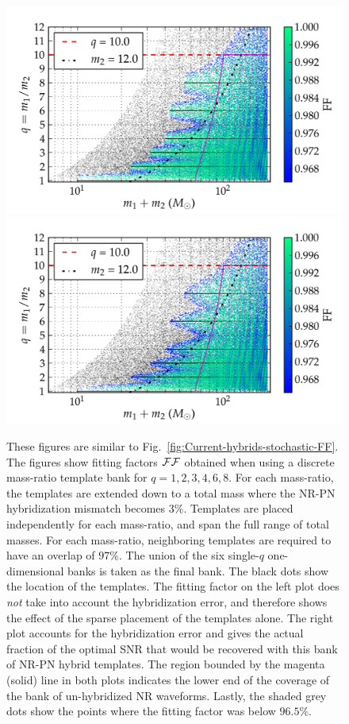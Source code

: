 \begin{figure}
\begin{center}
\includegraphics[width=\columnwidth]{figures/nrhybbank/bank_26022013_02_mtot200_logMq_NOhybMM-tiny.png}
\includegraphics[width=\columnwidth]{figures/nrhybbank/bank_26022013_02_mtot200_logMq_hybMM-tiny.png}
\caption{\label{fig:Current-hybrids-FF}These figures are similar to 
  Fig.~\ref{fig:Current-hybrids-stochastic-FF}. The figures show fitting
  factors $\mathcal{FF}$ obtained when using a discrete mass-ratio template bank for
  $q=1,2,3,4,6,8$. For each mass-ratio, the templates are extended down 
  to a total mass where the NR-PN hybridization mismatch becomes
  $3\%$. Templates are placed independently for each mass-ratio, and span the 
  full range of total masses. For each mass-ratio, neighboring templates are 
  required to have an overlap of $97\%$. The union of the six single-$q$ 
  one-dimensional banks is taken as the final bank. The black dots show the 
  location of the templates. The fitting factor on the left plot does 
  {\em not} take into account the hybridization error, and therefore shows the
  effect of the sparse placement of the templates alone. The right plot accounts
  for the hybridization error
  and gives the actual fraction of the optimal SNR that would be recovered
  with this bank of NR-PN hybrid templates. The region bounded by the magenta 
  (solid) line in both plots indicates the lower end of the coverage of the 
  bank of un-hybridized NR waveforms. Lastly, the shaded grey dots show the 
  points where the fitting factor was below $96.5\%$.}
\end{center}
\end{figure}

